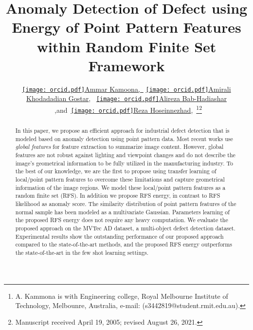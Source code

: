 \documentclass[journal]{IEEEtran}
\begin{document}
\title{Anomaly Detection of Defect using Energy of Point Pattern Features within Random Finite Set Framework}


\author{\href{https://orcid.org/0000-0002-7441-9344}{\texttt{[image: orcid.pdf]}\hspace{1mm}Ammar Kamoona,~\IEEEmembership{}}
        \href{https://orcid.org/0000-0002-4800-6554}{\texttt{[image: orcid.pdf]}\hspace{1mm}Amirali Khodadadian Gostar},~\IEEEmembership{}
        \href{https://orcid.org/0000-0002-6192-2303}{\texttt{[image: orcid.pdf]}\hspace{1mm}Alireza Bab-Hadiashar} ~\IEEEmembership{},and~\href{https://orcid.org/0000-0001-9525-1467}{\texttt{[image: orcid.pdf]}\hspace{1mm}Reza Hoseinnezhad},~\IEEEmembership{}\thanks{A. Kammona is with Engineering college, Royal Melbourne Institute of Technology, Melbounre,
Australia, e-mail: (s3442819@student.rmit.edu.au).}\thanks{Manuscript received April 19, 2005; revised August 26, 2021.}}



















\maketitle

\begin{abstract}
In this paper, we propose an efficient approach for industrial defect detection that is modeled based on anomaly detection using point pattern data. Most recent works use \textit{global features} for feature extraction to summarize image content. However, global features are not robust against lighting and viewpoint changes and do not describe the image's geometrical information to be fully utilized in the manufacturing industry. To the best of our knowledge, we are the first to propose using transfer learning of local/point pattern features to overcome these limitations and capture geometrical information of the image regions. We model these local/point pattern features as a random finite set (RFS). In addition we propose RFS energy, in contrast to RFS likelihood as anomaly score. The similarity distribution of point pattern features of  the normal sample has been modeled as a multivariate Gaussian. Parameters learning of the proposed RFS energy does not require any heavy computation. We evaluate the proposed approach on the MVTec AD dataset, a multi-object defect detection dataset. Experimental results show the outstanding performance of our proposed approach compared to the state-of-the-art methods, and the proposed RFS energy outperforms the state-of-the-art in the few shot learning settings. 
\end{abstract}
\end{document}
